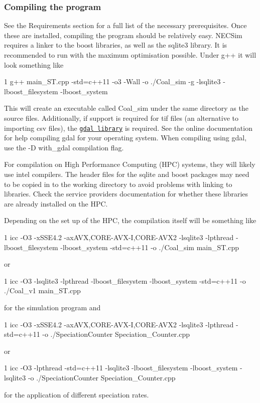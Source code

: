 \subsubsection*{Compiling the program}

See the Requirements section for a full list of the necessary prerequisites. Once these are installed, compiling the program should be relatively easy. N\+E\+C\+Sim requires a linker to the boost libraries, as well as the sqlite3 library. It is recommended to run with the maximum optimisation possible. Under {\ttfamily g++} it will look something like


\begin{DoxyCode}
1 g++ main\_ST.cpp -std=c++11 -o3 -Wall -o ./Coal\_sim -g  -lsqlite3 -lboost\_filesystem -lboost\_system
\end{DoxyCode}


This will create an executable called Coal\+\_\+sim under the same directory as the source files. Additionally, if support is required for tif files (an alternative to importing csv files), the \href{http://www.gdal.org/}{\tt gdal library} is required. See the online documentation for help compiling gdal for your operating system. When compiling using gdal, use the {\ttfamily -\/D with\+\_\+gdal} compilation flag.

For compilation on High Performance Computing (H\+PC) systems, they will likely use intel compilers. The header files for the sqlite and boost packages may need to be copied in to the working directory to avoid problems with linking to libraries. Check the service providers\textquotesingle{} documentation for whether these libraries are already installed on the H\+PC.

Depending on the set up of the H\+PC, the compilation itself will be something like 
\begin{DoxyCode}
1 icc -O3 -xSSE4.2 -axAVX,CORE-AVX-I,CORE-AVX2 -lsqlite3 -lpthread -lboost\_filesystem -lboost\_system
       -std=c++11 -o ./Coal\_sim main\_ST.cpp 
\end{DoxyCode}
 or 
\begin{DoxyCode}
1 icc -O3 -lsqlite3 -lpthread -lboost\_filesystem -lboost\_system -std=c++11 -o ./Coal\_v1 main\_ST.cpp
\end{DoxyCode}


for the simulation program and 
\begin{DoxyCode}
1 icc -O3 -xSSE4.2 -axAVX,CORE-AVX-I,CORE-AVX2 -lsqlite3 -lpthread -std=c++11 -o ./SpeciationCounter
       Speciation\_Counter.cpp
\end{DoxyCode}
 or 
\begin{DoxyCode}
1 icc -O3 -lpthread -std=c++11 -lsqlite3 -lboost\_filesystem -lboost\_system -lsqlite3 -o ./SpeciationCounter
       Speciation\_Counter.cpp
\end{DoxyCode}
 for the application of different speciation rates.

